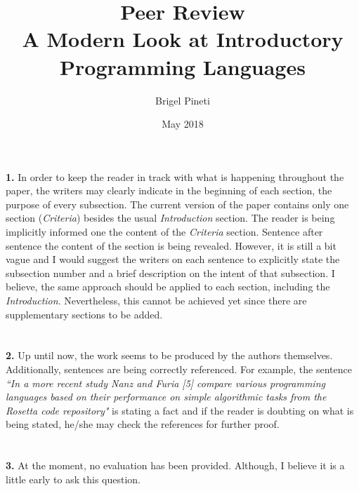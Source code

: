 \documentclass{article}
\title{\Large{Peer Review} \\
    \huge\textbf{{A Modern Look at Introductory Programming Languages}}}
\author{Brigel Pineti}
\date{May 2018}
\begin{document}
    
    \maketitle
    
    \section*{}
    \textbf{1. } In order to keep the reader in track with what is happening throughout the paper, the writers may clearly indicate in the beginning of each section, the purpose of every subsection. The current version of the paper contains only one section (\textit{Criteria}) besides the usual \textit{Introduction} section. The reader is being implicitly informed one the content of the \textit{Criteria} section. Sentence after sentence the content of the section is being revealed. However, it is still a bit vague and I would suggest the writers on each sentence to explicitly state the subsection number and a brief description on the intent of that subsection. I believe, the same approach should be applied to each section, including the \textit{Introduction}. Nevertheless, this cannot be achieved yet since there are supplementary sections to be added.  
    
    \section*{}
    \textbf{2. }  Up until now, the work seems to be produced by the authors themselves. Additionally, sentences are being correctly referenced. For example, the sentence \textit{``In a more recent study Nanz and Furia [5] compare various programming languages based on their performance on simple algorithmic tasks from the Rosetta code repository"} is stating a fact and if the reader is doubting on what is being stated, he/she may check the references for further proof.
    
    \section*{}
    \textbf{3. } At the moment, no evaluation has been provided. Although, I believe it is a little early to ask this question.
    
\end{document}
